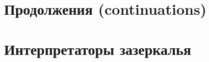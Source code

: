 \documentclass[12pt]{article}
\begin{document}



    \section{Продолжения (continuations)} \label{sec:continuations}















    \cite{reynolds1972definitional, reynolds1998definitional, defunctionalization-slides}







    \section{Интерпретаторы зазеркалья} \label{sec:wonder-interpreters}


\end{document}
